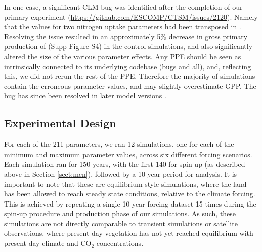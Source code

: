 \documentclass[draft]{agujournal2019}
\begin{document}
In one case, a significant CLM bug was identified after the completion of our primary experiment (\url{https://github.com/ESCOMP/CTSM/issues/2120}). Namely that the values for two nitrogen uptake parameters had been transposed in . Resolving the issue resulted in an approximately 5\% decrease in gross primary production of (Supp Figure S4) in the control simulations, and also significantly altered the size of the various parameter effects. Any PPE should be seen as intrinsically connected to its underlying codebase (bugs and all), and, reflecting this, we did not rerun the rest of the PPE. Therefore the majority of simulations contain the erroneous parameter values, and may slightly overestimate GPP.  The bug has since been resolved in later model versions .

\subsection{Experimental Design}
\label{sect:exp}
For each of the 211 parameters, we ran 12 simulations, one for each of the minimum and maximum parameter values, across six different forcing scenarios. Each simulation ran for 150 years, with the first 140 for spin-up (as described above in Section \ref{sect:mcn}), followed by a 10-year period for analysis. It is important to note that these are equilibrium-style simulations, where the land has been allowed to reach steady state conditions, relative to the climate forcing. This is achieved by repeating a single 10-year forcing dataset 15 times during the spin-up procedure and production phase of our simulations. As such, these simulations are not directly comparable to transient simulations or satellite observations, where present-day vegetation has not yet reached equilibrium with present-day climate and CO$_2$ concentrations.
\end{document}
